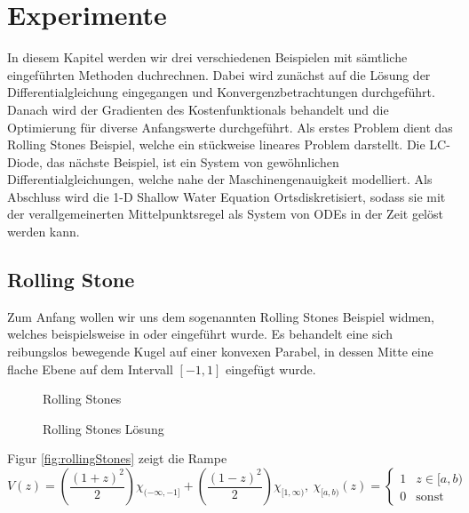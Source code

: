 \chapter{Experimente}
In diesem Kapitel werden wir drei verschiedenen Beispielen mit sämtliche eingeführten Methoden duchrechnen. Dabei wird zunächst auf die Lösung der Differentialgleichung eingegangen und Konvergenzbetrachtungen durchgeführt. Danach wird der Gradienten des Kostenfunktionals behandelt und die Optimierung für diverse Anfangswerte durchgeführt.
Als erstes Problem dient das Rolling Stones Beispiel, welche ein stückweise lineares Problem darstellt. Die LC- Diode, das nächste Beispiel, ist ein System von gewöhnlichen Differentialgleichungen, welche nahe der Maschinengenauigkeit modelliert. Als Abschluss wird die 1-D Shallow Water Equation Ortsdiskretisiert, sodass sie mit der verallgemeinerten Mittelpunktsregel als System von ODEs in der Zeit gelöst werden kann.
\section{Rolling Stone}
Zum Anfang wollen wir uns dem sogenannten Rolling Stones Beispiel widmen, welches beispielsweise in \cite{boeck2014experiments} oder \cite{hasenfelder13} eingeführt wurde. 
Es behandelt eine sich reibungslos bewegende Kugel auf einer konvexen Parabel, in dessen Mitte eine flache Ebene auf dem Intervall $[-1,1]$ eingefügt wurde. 
\begin{figure}[ht]
\centering
\begin{minipage}[b]{0.49\linewidth}

\caption{Rolling Stones}
\label{fig:rollingStones}
\end{minipage}
\begin{minipage}[b]{0.49\linewidth}

\caption{Rolling Stones Lösung}
\label{fig:rollingStonesSolution}
\end{minipage}
\end{figure}
Figur \ref{fig:rollingStones} zeigt die Rampe
\[
 V(z) = \left(\frac{(1+z)^2}{2}\right)\chi_{(-\infty,-1]} + \left(\frac{(1-z)^2}{2}\right)\chi_{[1,\infty)} ,
 ~ \chi_{[a,b)}(z) = 
 \begin{cases}
  1 & z \in [a,b)\\
  0 & \text{sonst}
 \end{cases}
\]

